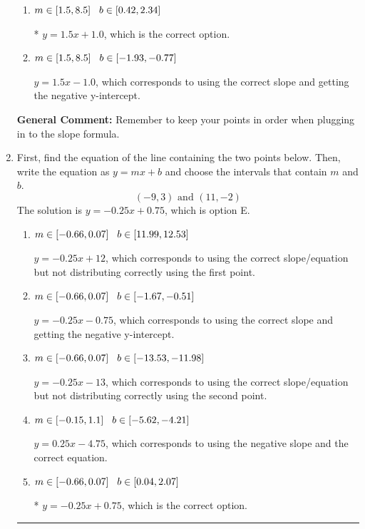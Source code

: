 \documentclass{extbook}[14pt]
\newcommand{\litem}[1]{\item #1

\rule{\textwidth}{0.4pt}}
\begin{document}
\begin{enumerate}
{\begin{enumerate}[label=\Alph*.]
 $y = 1.5x -2$, which corresponds to using the correct slope/equation but not distributing correctly using the first point.
\item \( m \in [1.5, 8.5] \hspace*{3mm} b \in [0.42, 2.34] \)

* $y = 1.5x + 1.0$, which is the correct option.
\item \( m \in [1.5, 8.5] \hspace*{3mm} b \in [-1.93, -0.77] \)

 $y = 1.5x -1.0$, which corresponds to using the correct slope and getting the negative y-intercept.
\end{enumerate}

\textbf{General Comment:} Remember to keep your points in order when plugging in to the slope formula.
}
\litem{
First, find the equation of the line containing the two points below. Then, write the equation as $ y=mx+b $ and choose the intervals that contain $m$ and $b$.
\[ (-9, 3) \text{ and } (11, -2) \]
The solution is \( y = -0.25x + 0.75 \), which is option E.\begin{enumerate}[label=\Alph*.]
\item \( m \in [-0.66, 0.07] \hspace*{3mm} b \in [11.99, 12.53] \)

 $y = -0.25x + 12$, which corresponds to using the correct slope/equation but not distributing correctly using the first point.
\item \( m \in [-0.66, 0.07] \hspace*{3mm} b \in [-1.67, -0.51] \)

 $y = -0.25x -0.75$, which corresponds to using the correct slope and getting the negative y-intercept.
\item \( m \in [-0.66, 0.07] \hspace*{3mm} b \in [-13.53, -11.98] \)

 $y = -0.25x -13$, which corresponds to using the correct slope/equation but not distributing correctly using the second point.
\item \( m \in [-0.15, 1.1] \hspace*{3mm} b \in [-5.62, -4.21] \)

 $y = 0.25x -4.75$, which corresponds to using the negative slope and the correct equation.
\item \( m \in [-0.66, 0.07] \hspace*{3mm} b \in [0.04, 2.07] \)

* $y = -0.25x + 0.75$, which is the correct option.
\end{enumerate}

}
\end{enumerate}
\end{document}
